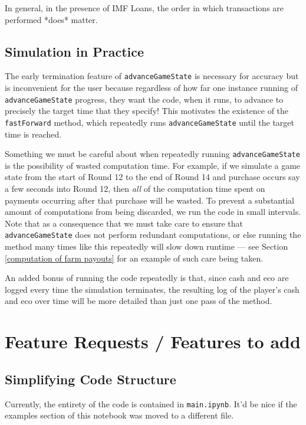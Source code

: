 \documentclass[12pt,letterpaper]{article}
\theoremstyle{remark}
\theoremstyle{plain}
\begin{document}
In general, in the presence of IMF Loans, the order in which transactions are performed *does* matter.

\subsection{Simulation in Practice}

The early termination feature of \texttt{advanceGameState} is necessary for accuracy but is inconvenient for the user because regardless of how far one instance running of \texttt{advanceGameState} progress, they want the code, when it runs, to advance to precisely the target time that they specify!  This motivates the existence of the \texttt{fastForward} method, which repeatedly runs \texttt{advanceGameState} until the target time is reached.

Something we must be careful about when repeatedly running \texttt{advanceGameState} is the possibility of wasted computation time. For example, if we simulate a game state from the start of Round 12 to the end of Round 14 and purchase occurs say a few seconds into Round 12, then \textit{all} of the computation time spent on payments occurring after that purchase will be wasted. To prevent a substantial amount of computations from being discarded, we run the code in small intervals. Note that as a consequence that we must take care to ensure that \texttt{advanceGameState} does not perform redundant computations, or else running the method many times like this repeatedly will slow down runtime --- see Section \ref{computation of farm payouts} for an example of such care being taken.

An added bonus of running the code repeatedly is that, since cash and eco are logged every time the simulation terminates, the resulting log of the player's cash and eco over time will be more detailed than just one pass of the method.

\section{Feature Requests / Features to add}

\subsection{Simplifying Code Structure}

Currently, the entirety of the code is contained in \texttt{main.ipynb}. It'd be nice if the examples section of this notebook was moved to a different file.
\end{document}
